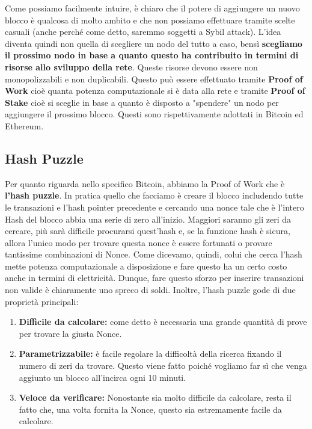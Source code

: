 Come possiamo facilmente intuire, è chiaro che il potere di aggiungere un nuovo blocco è qualcosa di molto ambito e che non possiamo effettuare tramite scelte casuali (anche perché come detto, saremmo soggetti a Sybil attack). L'idea diventa quindi non quella di scegliere un nodo del tutto a caso, bensì \textbf{scegliamo il prossimo nodo in base a quanto questo ha contribuito in termini di risorse allo sviluppo della rete}. Queste risorse devono essere non monopolizzabili e non duplicabili. Questo può essere effettuato tramite \textbf{Proof of Work} cioè quanta potenza computazionale si è data alla rete e tramite \textbf{Proof of Stake} cioè si sceglie in base a quanto è disposto a "spendere" un nodo per aggiungere il prossimo blocco. Questi sono rispettivamente adottati in Bitcoin ed Ethereum. 

\subsection*{Hash Puzzle}
Per quanto riguarda nello specifico Bitcoin, abbiamo la Proof of Work che è \textbf{l'hash puzzle}. In pratica quello che facciamo è creare il blocco includendo tutte le transazioni e l'hash pointer precedente e cercando una nonce tale che è l'intero Hash del blocco abbia una serie di zero all'inizio. Maggiori saranno gli zeri da cercare, più sarà difficile procurarsi quest'hash e, se la funzione hash è sicura, allora l'unico modo per trovare questa nonce è essere fortunati o provare tantissime combinazioni di Nonce.
Come dicevamo, quindi, colui che cerca l'hash mette potenza computazionale a disposizione e fare questo ha un certo costo anche in termini di elettricità. Dunque, fare questo sforzo per inserire transazioni non valide è chiaramente uno spreco di soldi. 
Inoltre, l'hash puzzle gode di due proprietà principali:
\begin{enumerate}
    \item \textbf{Difficile da calcolare: }come detto è necessaria una grande quantità di prove per trovare la giusta Nonce.
    \item \textbf{Parametrizzabile:} è facile regolare la difficoltà della ricerca fixando il numero di zeri da trovare. Questo viene fatto poiché vogliamo far sì che venga aggiunto un blocco all'incirca ogni 10 minuti.
    \item \textbf{Veloce da verificare: }Nonostante sia molto difficile da calcolare, resta il fatto che, una volta fornita la Nonce, questo sia estremamente facile da calcolare.
\end{enumerate}

